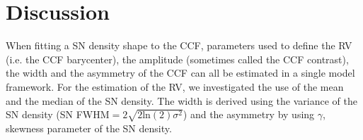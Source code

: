 \documentclass{aa}
\begin{document}


\section{Discussion} \label{sec:discu}

When fitting a SN density shape to the CCF, parameters used to define the RV (i.e. the CCF barycenter), the amplitude (sometimes called the CCF contrast), the width and the asymmetry of the CCF can all be estimated in a single model framework.
For the estimation of the RV, we investigated the use of the mean and the median of the SN density. 
The width is derived using the variance of the SN density (SN FWHM$=2\sqrt{2\text{ln}(2)\sigma^2}$) and the asymmetry by using $\gamma$, skewness parameter of the SN density.
\end{document}
